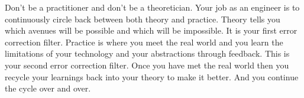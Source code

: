 Don't be a practitioner and don't be a theoretician. Your job as an engineer is to continuously circle back between both theory and practice. Theory tells
you which avenues will be possible and which will be impossible. It is your first error correction filter. Practice is where you meet
the real world and you learn the limitations of your technology and your abstractions through feedback. This is your second error correction filter. Once
you have met the real world then you recycle your learnings back into your theory to make it better. And you continue the cycle over and over.
